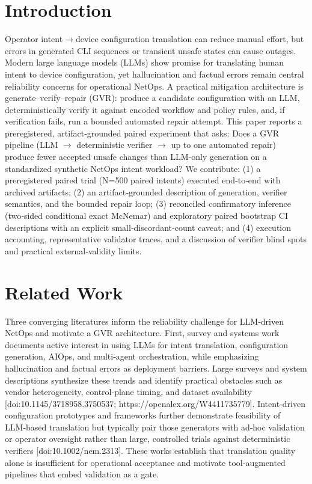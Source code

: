 \documentclass[conference]{IEEEtran}
\begin{document}
\section{Introduction}
Operator intent\ensuremath{\rightarrow}device configuration translation can reduce manual effort, but errors in generated CLI sequences or transient unsafe states can cause outages. Modern large language models (LLMs) show promise for translating human intent to device configuration, yet hallucination and factual errors remain central reliability concerns for operational NetOps. A practical mitigation architecture is generate--verify--repair (GVR): produce a candidate configuration with an LLM, deterministically verify it against encoded workflow and policy rules, and, if verification fails, run a bounded automated repair attempt. This paper reports a preregistered, artifact‑grounded paired experiment that asks: Does a GVR pipeline (LLM \ensuremath{\rightarrow} deterministic verifier \ensuremath{\rightarrow} up to one automated repair) produce fewer accepted unsafe changes than LLM‑only generation on a standardized synthetic NetOps intent workload? We contribute: (1) a preregistered paired trial (N=500 paired intents) executed end‑to‑end with archived artifacts; (2) an artifact‑grounded description of generation, verifier semantics, and the bounded repair loop; (3) reconciled confirmatory inference (two‑sided conditional exact McNemar) and exploratory paired bootstrap CI descriptions with an explicit small‑discordant‑count caveat; and (4) execution accounting, representative validator traces, and a discussion of verifier blind spots and practical external‑validity limits.

\section{Related Work}
Three converging literatures inform the reliability challenge for LLM‑driven NetOps and motivate a GVR architecture. First, survey and systems work documents active interest in using LLMs for intent translation, configuration generation, AIOps, and multi‑agent orchestration, while emphasizing hallucination and factual errors as deployment barriers. Large surveys and system descriptions synthesize these trends and identify practical obstacles such as vendor heterogeneity, control‑plane timing, and dataset availability [doi:10.1145/3718958.3750537; https://openalex.org/W4411735779]. Intent‑driven configuration prototypes and frameworks further demonstrate feasibility of LLM‑based translation but typically pair those generators with ad‑hoc validation or operator oversight rather than large, controlled trials against deterministic verifiers [doi:10.1002/nem.2313]. These works establish that translation quality alone is insufficient for operational acceptance and motivate tool‑augmented pipelines that embed validation as a gate.
\end{document}

